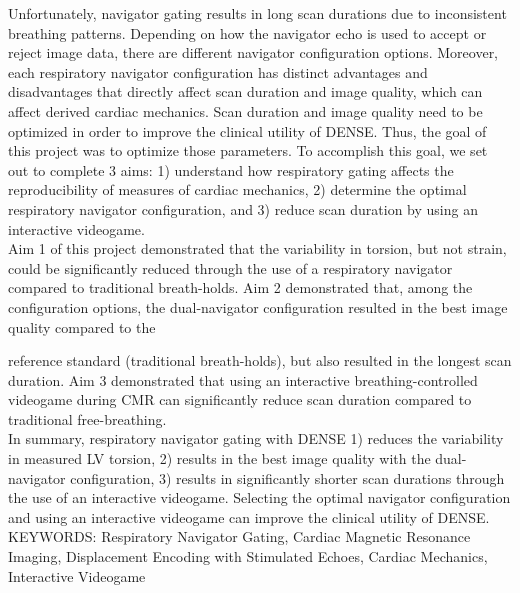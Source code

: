 Unfortunately, navigator gating results in long scan durations due to inconsistent breathing patterns. Depending on how the navigator echo is used to accept or reject image data, there are different navigator configuration options. Moreover, each respiratory navigator configuration has distinct advantages and disadvantages that directly affect scan duration and image quality, which can affect derived cardiac mechanics. Scan duration and image quality need to be optimized in order to improve the clinical utility of DENSE. Thus, the goal of this project was to optimize those parameters. To accomplish this goal, we set out to complete 3 aims: 1) understand how respiratory gating affects the reproducibility of measures of cardiac mechanics, 2) determine the optimal respiratory navigator configuration, and 3) reduce scan duration by using an interactive videogame.\\

Aim 1 of this project demonstrated that the variability in torsion, but not strain, could be significantly reduced through the use of a respiratory navigator compared to traditional breath-holds. Aim 2 demonstrated that, among the configuration options, the dual-navigator configuration resulted in the best image quality compared to the

\restoregeometry
\thispagestyle{empty} %

\noindent reference standard (traditional breath-holds), but also resulted in the longest scan duration. Aim 3 demonstrated that using an interactive breathing-controlled videogame during CMR can significantly reduce scan duration compared to traditional free-breathing. \\

In summary, respiratory navigator gating with DENSE 1) reduces the variability in measured LV torsion, 2) results in the best image quality with the dual-navigator configuration, 3) results in significantly shorter scan durations through the use of an interactive videogame. Selecting the optimal navigator configuration and using an interactive videogame can improve the clinical utility of DENSE.\\

\vspace{0.25in}
\noindent KEYWORDS: Respiratory Navigator Gating, Cardiac Magnetic Resonance Imaging, Displacement Encoding with Stimulated Echoes, Cardiac Mechanics, Interactive Videogame

\vspace{5.03125in}        %
					



